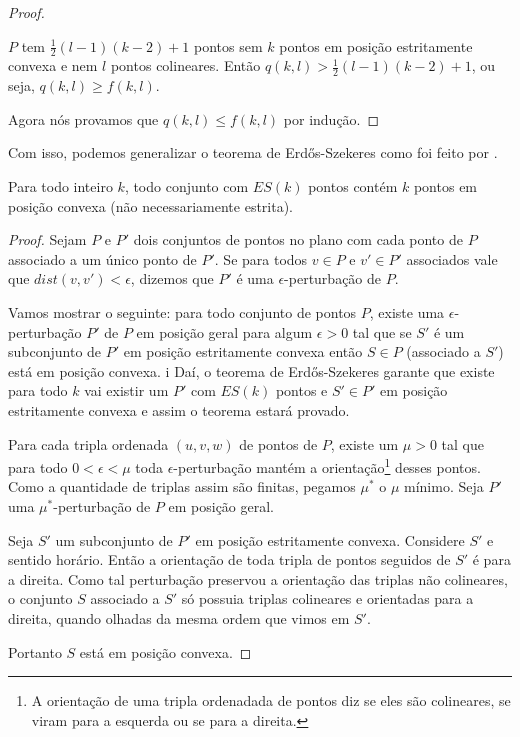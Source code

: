 \begin{proof}
\begin{center}
    \end{center}

    $P$ tem $\frac{1}{2}(l-1)(k-2)+1$ pontos sem $k$ pontos em posição estritamente convexa e nem $l$ pontos colineares. Então $q(k,l)>\frac{1}{2}(l-1)(k-2)+1$, ou seja, $q(k,l)\geq f(k,l)$.

    Agora nós provamos que $q(k,l)\leq f(k,l)$ por indução.
\end{proof}

Com isso, podemos generalizar o teorema de Erd\H os-Szekeres como foi feito por \cite{pentagon}.

\begin{teorema}\label{EScolinear}
    Para todo inteiro $k$, todo conjunto com $ES(k)$ pontos contém $k$ pontos em posição convexa (não necessariamente estrita).
\end{teorema}
\begin{proof}
    Sejam $P$ e $P'$ dois conjuntos de pontos no plano com cada ponto de $P$ associado a um único ponto de $P'$. Se para todos $v\in P$ e $v'\in P'$ associados vale que $dist(v,v')<\epsilon$, dizemos que $P'$ é uma $\epsilon$-perturbação de $P$.

    Vamos mostrar o seguinte: para todo conjunto de pontos $P$, existe uma $\epsilon$-perturbação $P'$ de $P$ em posição geral para algum $\epsilon>0$ tal que se $S'$ é um subconjunto de $P'$ em posição estritamente convexa então $S\in P$ (associado a $S'$) está em posição convexa.
i
    Daí, o teorema de Erd\H os-Szekeres garante que existe para todo $k$ vai existir um $P'$ com $ES(k)$ pontos e $S'\in P'$ em posição estritamente convexa e assim o teorema estará provado.
    
    Para cada tripla ordenada $(u,v,w)$ de pontos de $P$, existe um $\mu>0$ tal que para todo $0<\epsilon<\mu$ toda $\epsilon$-perturbação mantém a orientação\footnote{A orientação de uma tripla ordenadada de pontos diz se eles são colineares, se viram para a esquerda ou se para a direita.} desses pontos. Como a quantidade de triplas assim são finitas, pegamos $\mu^*$ o $\mu$ mínimo. Seja $P'$ uma $\mu^*$-perturbação de $P$ em posição geral.

    Seja $S'$ um subconjunto de $P'$ em posição estritamente convexa. Considere $S'$ e sentido horário. Então a orientação de toda tripla de pontos seguidos de $S'$ é para a direita. Como tal perturbação preservou a orientação das triplas não colineares, o conjunto $S$ associado a $S'$ só possuia triplas colineares e orientadas para a direita, quando olhadas da mesma ordem que vimos em $S'$.

    Portanto $S$ está em posição convexa.
\end{proof}
